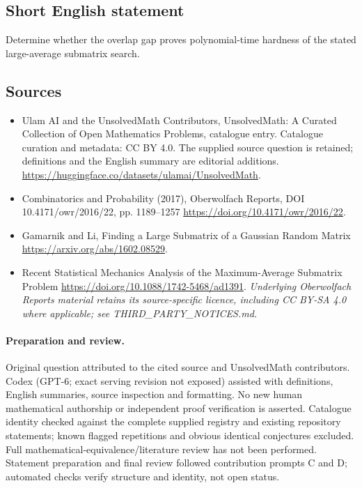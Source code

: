 \documentclass[11pt]{article}
\begin{document}
\subsection{Short English statement}
Determine whether the overlap gap proves polynomial-time hardness of the stated large-average submatrix search.
\subsection{Sources}
\begin{itemize}
\item[\hypertarget{source:statement:1}{S1}] Ulam AI and the UnsolvedMath Contributors, UnsolvedMath: A Curated Collection of Open Mathematics Problems, catalogue entry. Catalogue curation and metadata: CC BY 4.0. The supplied source question is retained; definitions and the English summary are editorial additions.
\url{https://huggingface.co/datasets/ulamai/UnsolvedMath}.
\item[\hypertarget{source:statement:2}{S2}] Combinatorics and Probability (2017), Oberwolfach Reports, DOI 10.4171/owr/2016/22, pp. 1189--1257
\url{https://doi.org/10.4171/owr/2016/22}.
\item[\hypertarget{source:statement:3}{S3}] Gamarnik and Li, Finding a Large Submatrix of a Gaussian Random Matrix
\url{https://arxiv.org/abs/1602.08529}.
\item[\hypertarget{source:statement:4}{S4}] Recent Statistical Mechanics Analysis of the Maximum-Average Submatrix Problem
\url{https://doi.org/10.1088/1742-5468/ad1391}.
\textit{Underlying Oberwolfach Reports material retains its source-specific licence, including CC BY-SA 4.0 where applicable; see THIRD\_PARTY\_NOTICES.md.}
\end{itemize}
\paragraph{Preparation and review.}
Original question attributed to the cited source and UnsolvedMath contributors. Codex (GPT-6; exact serving revision not exposed) assisted with definitions, English summaries, source inspection and formatting. No new human mathematical authorship or independent proof verification is asserted. Catalogue identity checked against the complete supplied registry and existing repository statements; known flagged repetitions and obvious identical conjectures excluded. Full mathematical-equivalence/literature review has not been performed. Statement preparation and final review followed contribution prompts C and D; automated checks verify structure and identity, not open status.
\label{end:statement}
\end{document}
